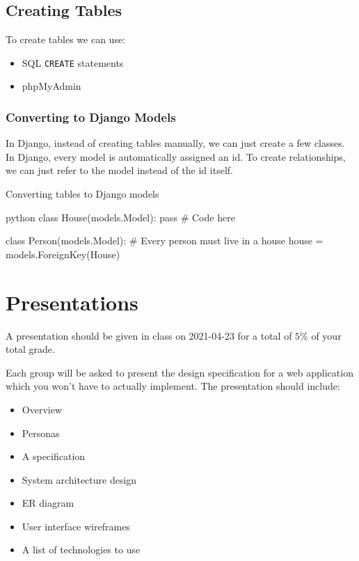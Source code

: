 \subsection{Creating Tables}\label{sub:creating_tables}

To create tables we can use:
\begin{itemize}
    \item SQL \texttt{CREATE} statements
    \item phpMyAdmin
\end{itemize}

\subsubsection{Converting to Django Models}\label{ssub:converting_to_django_models}

In Django, instead of creating tables manually, we can just create a few classes.
In Django, every model is automatically assigned an id.
To create relationships, we can just refer to the model instead of the id itself.

\begin{highlight}{Converting tables to Django models}
    \begin{code}{python}
        class House(models.Model):
            pass # Code here

        class Person(models.Model):
            # Every person must live in a house
            house = models.ForeignKey(House)
    \end{code}
\end{highlight}

\section{Presentations}\label{sec:presentations}

A presentation should be given in class on 2021-04-23 for a total of \(5\%\) of your total grade.

Each group will be asked to present the design specification for a web application which you won't have to actually implement.
The presentation should include:
\begin{itemize}
    \item Overview
    \item Personas
    \item A specification
    \item System architecture design
    \item ER diagram
    \item User interface wireframes
    \item A list of technologies to use
\end{itemize}
